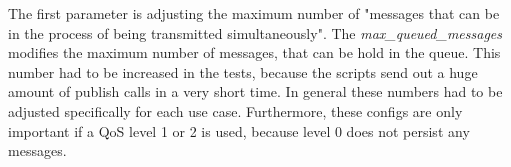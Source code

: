 The first parameter is adjusting the maximum number of "messages that can be in the process of being transmitted simultaneously"\autocite{Mosquitto:Conf:Documentation}.
The \textit{max\_queued\_messages} modifies the maximum number of messages, that can be hold in the queue.\autocite[cf.]{Mosquitto:Conf:Documentation}
This number had to be increased in the tests, because the scripts send out a huge amount of publish calls in a very short time.
In general these numbers had to be adjusted specifically for each use case.
Furthermore, these configs are only important if a \ac{QoS} level 1 or 2 is used, because level 0 does not persist any messages.
